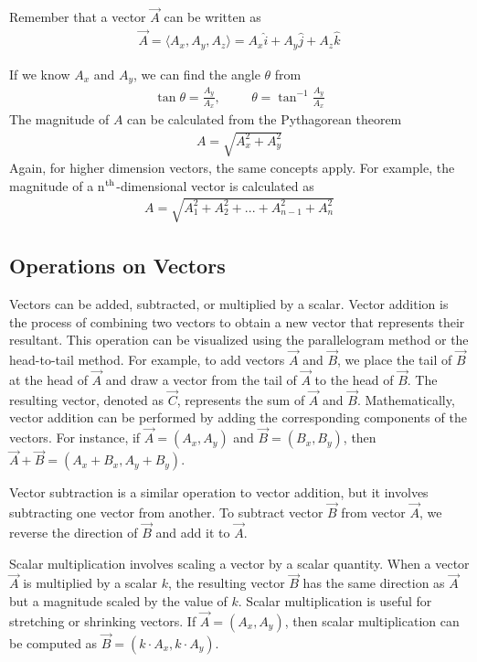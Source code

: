 \documentclass[11pt]{article}
\begin{document}
Remember that a vector $\Vec{A}$ can be written as
\begin{align*}
    \Vec{A} = \langle A_x, A_y, A_z \rangle = A_x \hat{i} + A_y \hat{j} + A_z \hat{k}
\end{align*}

If we know $A_{x}$ and $A_{y}$, we can find the angle $\theta$ from
\begin{align*}
    \tan{\theta} = \frac{A_y}{A_x},\hspace{1cm}\theta = \tan^{-1}\frac{A_y}{A_x}    
\end{align*}
The magnitude of $A$ can be calculated from the Pythagorean theorem
\begin{align*}
    A = \sqrt{A_{x}^{2} + A_{y}^{2}}
\end{align*}
Again, for higher dimension vectors, the same concepts apply. For example, the magnitude of a n$\textsuperscript{th}$-dimensional vector is calculated as
\begin{align*}
    A = \sqrt{A_{1}^{2} + A_{2}^{2} +... + A_{n-1}^{2} +A_{n}^{2}}
\end{align*}

\subsection{Operations on Vectors}

Vectors can be added, subtracted, or multiplied by a scalar. Vector addition is the process of combining two vectors to obtain a new vector that represents their resultant. This operation can be visualized using the parallelogram method or the head-to-tail method. For example, to add vectors \(\Vec{A}\) and \(\Vec{B}\), we place the tail of \(\Vec{B}\) at the head of \(\Vec{A}\) and draw a vector from the tail of \(\Vec{A}\) to the head of \(\Vec{B}\). The resulting vector, denoted as \(\Vec{C}\), represents the sum of \(\Vec{A}\) and \(\Vec{B}\). Mathematically, vector addition can be performed by adding the corresponding components of the vectors. For instance, if \(\Vec{A} = (A_x, A_y)\) and \(\Vec{B} = (B_x, B_y)\), then \(\Vec{A} + \Vec{B} = (A_x + B_x, A_y + B_y)\).

Vector subtraction is a similar operation to vector addition, but it involves subtracting one vector from another. To subtract vector \(\Vec{B}\) from vector \(\Vec{A}\), we reverse the direction of \(\Vec{B}\) and add it to \(\Vec{A}\). 

Scalar multiplication involves scaling a vector by a scalar quantity. When a vector \(\Vec{A}\) is multiplied by a scalar \(k\), the resulting vector \(\Vec{B}\) has the same direction as \(\Vec{A}\) but a magnitude scaled by the value of \(k\). Scalar multiplication is useful for stretching or shrinking vectors. If \(\Vec{A} = (A_x, A_y)\), then scalar multiplication can be computed as \(\Vec{B} = (k \cdot A_x, k \cdot A_y)\).
\end{document}
